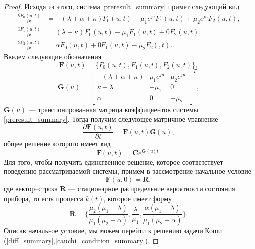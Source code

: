 \begin{proof}
	Исходя из этого, система \eqref{preresult_summary} примет следующий вид
	\begin{equation} \label{result_summary}
		\begin{split}
			\frac{{\partial F_{0}(u,t)}}{{\partial t}} &= -(\lambda + \alpha+ \kappa)F_{0}(u,t) + \mu_{1} e^{ju}F_{1}(u,t) + \mu_{2}e^{ju}F_{2}(u,t) ,
			\\
			\frac{{\partial F_{1}(u,t)}}{{\partial t}} &= (\lambda + \kappa)F_{0}(u,t) -  
			\mu_{1}F_{1}(u,t) +  0F_{2}(u,t) ,
			\\
			\frac{{\partial F_{2}(u,t)}}{{\partial t}} &= \alpha F_{0}(u,t)   +  0F_{1}(u,t) - \mu_{2}F_{2}(,t).
		\end{split}
	\end{equation}  
	Введем следующие обозначения
	\begin{equation*}
		\boldsymbol{F}(u,t) = \{F_{0}(u,t),F_{1}(u,t),F_{2}(u,t)\},
	\end{equation*}  
	\begin{equation*}
		\boldsymbol{G}(u)=\begin{bmatrix}
			-(\lambda + \alpha + \kappa) & \mu_{1}e^{ju} &  \mu_{2}e^{ju}\\
			\kappa+\lambda & -\mu_{1} & 0\\
			\alpha & 	0 &	-\mu_{2}
		\end{bmatrix}^{T},
	\end{equation*}
	$\boldsymbol{G}(u)$ --- транспонированная матрица коэффициентов системы \eqref{preresult_summary}.
	Тогда получим следующее матричное уравнение
	\begin{equation*}
		\frac{{\partial \boldsymbol{F}(u,t)}}{{\partial t}} =\boldsymbol{F}(u,t)\boldsymbol{G}(u),
	\end{equation*}
	общее решение которого имеет вид
	\begin{equation} \label{diff_summary}
		\boldsymbol{F}(u,t)=\boldsymbol{C}e^{\boldsymbol{G}(u)t}.
	\end{equation}
	Для того, чтобы получить единственное решение, которое соответствует поведению рассматриваемой системы, примем в рассмотрение начальное условие
	\begin{equation} \label{cauchi_condition_summary}
		\boldsymbol{F}(u,0)=\boldsymbol{R},
	\end{equation}
	где вектор--строка $\boldsymbol{R}$ --- стационарное распределение вероятности состояния прибора, то есть процесса $k(t)$, которое имеет форму \cite{nazarov2017asymptotic}
	\begin{equation*}
		\boldsymbol{R}=\{\frac{\mu_{2}(\mu_{1} - \lambda)}{\mu_{1}(\mu_{2} - \alpha)},\frac{\lambda}{\mu_{1}},\frac{\alpha(\mu_{1} - \lambda)}{\mu_{1}(\mu_{2} + \alpha)}\}.
	\end{equation*}
	Описав начальное условие, мы можем перейти к решению задачи Коши (\ref{diff_summary},\ref{cauchi_condition_summary}).
	

\end{proof}
